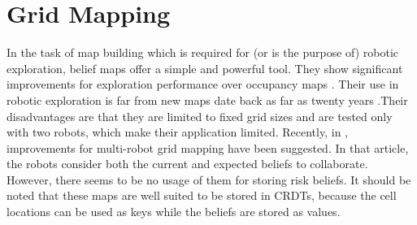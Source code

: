\section{Grid Mapping}
In the task of map building which is required for (or is the purpose of) robotic exploration, belief maps offer a simple and powerful tool. They show significant improvements for exploration performance over occupancy maps  \cite{stachnissMappingExplorationMobile2003}. Their use in robotic exploration is far from new maps date back as far as twenty years \cite{kobayashiSharingExploringInformation2002,kobayashiDeterminationExplorationTarget2003}.Their disadvantages are that they are limited to fixed grid sizes and are tested only with two robots, which make their application limited. Recently, in \cite{indelmanCooperativeMultirobotBelief2018}, improvements for multi-robot grid mapping have been suggested. In that article, the robots consider both the current and expected beliefs to collaborate. However, there seems to be no usage of them for storing risk beliefs. It should be noted that these maps are well suited to be stored in \ac{CRDT}s, because the cell locations can be used as keys while the beliefs are stored as values.
